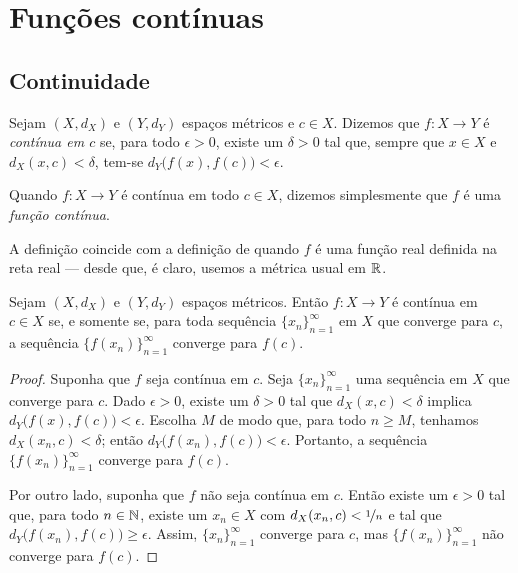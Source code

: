 \sectionnewpage
\section{Funções contínuas}
\label{sec:metcont}



\subsection{Continuidade}

\begin{defn}
Sejam $(X,d_X)$ e $(Y,d_Y)$ espaços métricos e $c \in X$.
Dizemos que $f \colon X \to Y$ é
\emph{contínua em $c$}
se, para todo $\epsilon > 0$,
existe um $\delta > 0$ tal que, sempre que $x \in X$ e $d_X(x,c) <
\delta$, tem-se
$d_Y\bigl(f(x),f(c)\bigr) < \epsilon$.

\medskip

Quando $f \colon X \to Y$ é contínua em todo $c \in X$, dizemos simplesmente
que $f$ é uma \emph{função contínua}.
\end{defn}

A definição coincide com a definição de  quando
$f$ é uma função real definida na reta real — desde que, é claro, usemos
a métrica usual em ${\mathbb{R}}$.

\begin{prop} \label{prop:contiscont}
Sejam $(X,d_X)$ e $(Y,d_Y)$ espaços métricos.
Então $f \colon X \to Y$ é
contínua em $c \in X$
se, e somente se, para toda sequência $\{ x_n \}_{n=1}^\infty$ em $X$
que converge para $c$, a sequência $\bigl\{ f(x_n) \bigr\}_{n=1}^\infty$ converge
para $f(c)$.
\end{prop}

\begin{proof}
Suponha que $f$ seja contínua em $c$. Seja $\{ x_n \}_{n=1}^\infty$ uma
sequência em $X$ que converge para $c$. Dado $\epsilon > 0$,
existe um $\delta > 0$ tal que $d_X(x,c) < \delta$ implica
$d_Y\bigl(f(x),f(c)\bigr) < \epsilon$. Escolha $M$ de modo que,
para todo $n \geq M$, tenhamos $d_X(x_n,c) < \delta$; então
$d_Y\bigl(f(x_n),f(c)\bigr) < \epsilon$. Portanto, a sequência $\bigl\{ f(x_n) \bigr\}_{n=1}^\infty$
converge para $f(c)$.

Por outro lado, suponha que $f$ não seja contínua em $c$.
Então existe um $\epsilon > 0$
tal que, para todo $n \in {\mathbb{N}}$, existe um $x_n \in X$
com
$d_X(x_n,c) < \nicefrac{1}{n}$ e tal que $d_Y\bigl(f(x_n),f(c)\bigr) \geq
\epsilon$. Assim, $\{ x_n \}_{n=1}^\infty$ converge para $c$, mas
$\bigl\{ f(x_n) \bigr\}_{n=1}^\infty$
não converge para $f(c)$.
\end{proof}

